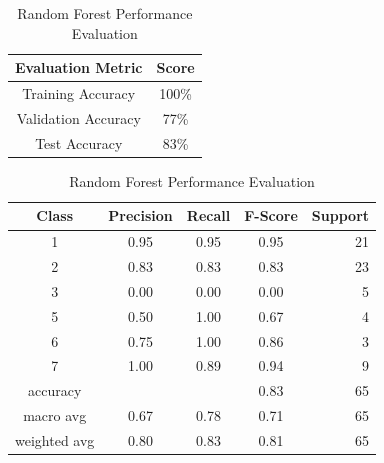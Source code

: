 \begin{table}[!ht]
\begin{subtable}[c]{0.4\textwidth}
\footnotesize
\centering
\begin{tabular}{ c | c }
 \toprule
 Evaluation Metric & Score  \\
 \midrule 
 Training Accuracy & 100\% \\
 Validation Accuracy & 77\% \\
 Test Accuracy & 83\% \\
 \bottomrule
\end{tabular}
\captionsetup{justification=centering,margin=1cm}
\end{subtable}
\begin{subtable}[c]{0.6\textwidth}
\footnotesize
\centering
\begin{tabular}{c | c c c r}
Class & Precision & Recall & F-Score & Support\\
\midrule
1   &  0.95  &  0.95  &  0.95  &  21\\ 
2   &  0.83  &  0.83  &  0.83  &  23\\
3   &  0.00  &  0.00  &  0.00  &   5\\
5   &  0.50  &  1.00  &  0.67  &   4\\
6   &  0.75  &  1.00  &  0.86  &   3\\
7   &  1.00  &  0.89  &  0.94  &   9\\
\midrule
    accuracy  &        &        &  0.83  &  65\\
   macro avg  &  0.67  &  0.78  &  0.71  &  65\\
weighted avg  &  0.80  &  0.83  &  0.81  &  65\\
\end{tabular}
\captionsetup{justification=centering,margin=1cm}
\end{subtable}
\caption{Random Forest Performance Evaluation}
\label{random_forest_evaluation}
\end{table}

